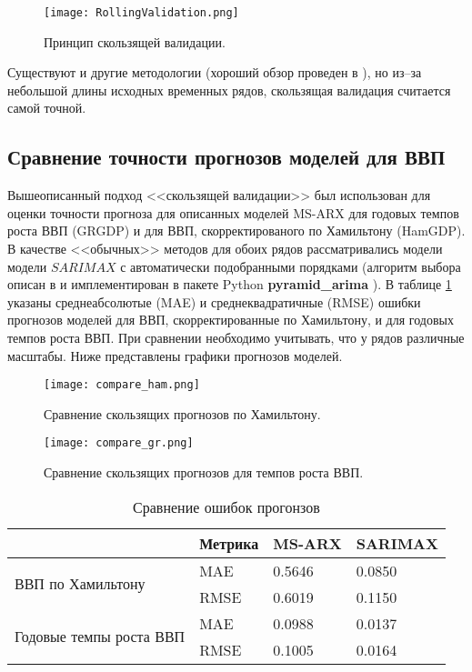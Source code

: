 \documentclass[a4paper,14pt]{extreport}
\begin{document}
	\begin{figure}
		\texttt{[image: RollingValidation.png]}
		\caption{Принцип скользящей валидации.}
		\label{fig:rolling_validation}
	\end{figure}
	
	Существуют и другие методологии (хороший обзор проведен в \cite{hyndCV}), но из--за небольшой длины исходных временных рядов, скользящая валидация считается самой точной.
	
	
	\subsection{Сравнение точности прогнозов моделей для ВВП}
	
	Вышеописанный подход <<скользящей валидации>> был использован для оценки точности прогноза для описанных моделей MS-ARX для годовых темпов роста ВВП (GRGDP) и для ВВП, скорректированого по Хамильтону (HamGDP). В качестве <<обычных>> методов для обоих рядов рассматривались модели модели $SARIMAX$ с автоматически подобранными порядками (алгоритм выбора описан в \cite{hynd_autoarima} и имплементирован в пакете Python \textbf{pyramid\_arima} \cite{pyramid_arima}). В таблице \ref{tbl:errors} указаны среднеабсолютые (MAE) и среднеквадратичные (RMSE) ошибки прогнозов моделей для ВВП, скорректированные по Хамильтону, и для годовых темпов роста ВВП. При сравнении необходимо учитывать, что у рядов различные масштабы. Ниже представлены графики прогнозов моделей.
	
	\begin{figure}
		\texttt{[image: compare\_ham.png]}
		\caption{Сравнение скользящих прогнозов по Хамильтону.}
		\label{fig:rollcompare-ham}
	\end{figure}
	
	\begin{figure}
		\texttt{[image: compare\_gr.png]}
		\caption{Сравнение скользящих прогнозов для темпов роста ВВП.}
		\label{fig:rollcompare-tr}
	\end{figure}
	
	\begin{table}[]
		\centering
		\caption{Сравнение ошибок прогонзов}
		\begin{tabular}{l|l|ll|}
			\cline{2-4}
			& Метрика & MS-ARX & SARIMAX \\ \hline
			\multicolumn{1}{|l|}{\multirow{2}{*}{ВВП по Хамильтону}}       & MAE     & 0.5646 & 0.0850  \\
			\multicolumn{1}{|l|}{}                                         & RMSE    & 0.6019 & 0.1150  \\ \hline
			\multicolumn{1}{|l|}{\multirow{2}{*}{Годовые темпы роста ВВП}} & MAE     & 0.0988 & 0.0137  \\
			\multicolumn{1}{|l|}{}                                         & RMSE    & 0.1005 & 0.0164  \\ \hline
		\end{tabular}
		\label{tbl:errors}
	\end{table}
	
\end{document}
